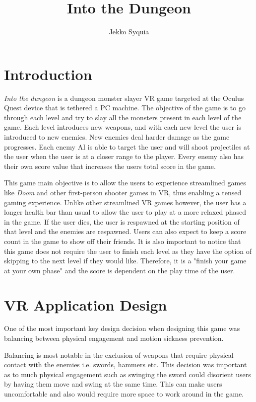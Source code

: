 \documentclass[12pt, twoside]{article}
\title{Into the Dungeon}
\author{Jekko Syquia}
\begin{document}
\maketitle
\titlepage

\tableofcontents
\newpage


\section{Introduction}

\emph{Into the dungeon} is a dungeon monster slayer VR game targeted at the
Oculus Quest device that is tethered a PC machine. The objective of the game is
to go through each level and try to slay all the monsters present in each level
of the game. Each level introduces new weapons, and with each new level the user
is introduced to new enemies. New enemies deal harder damage as the game
progresses. Each enemy AI is able to target the user and will shoot projectiles
at the user when the user is at a closer range to the player. Every enemy also
has their own score value that increases the users total score in the game. \par

This game main objective is to allow the users to experience streamlined games like
\emph{Doom} and other first-person shooter games in VR, thus enabling a tensed
gaming experience. Unlike other streamlined VR games however, the user has a
longer health bar than usual to allow the user to play at a more relaxed phased
in the game. If the user dies, the user is respawned at the starting position of
that level and the enemies are respawned. Users can also expect to keep a score
count in the game to show off their friends. It is also important to notice that
this game does not require the user to finish each level as they have the option
of skipping to the next level if they would like. Therefore, it is a "finish your
game at your own phase" and the score is dependent on the play time of the user.

\newpage
\section{VR Application Design}
One of the most important key design decision when designing this game was
balancing between physical engagement and motion sickness prevention. \par 

Balancing is most notable in the exclusion of weapons that require physical
contact with the enemies i.e. swords, hammers etc. This decision was important
as to much physical engagement such as swinging the sword could disorient users
by having them move and swing at the same time. This can make users
uncomfortable and also would require more space to work around in the game.\par
\end{document}
